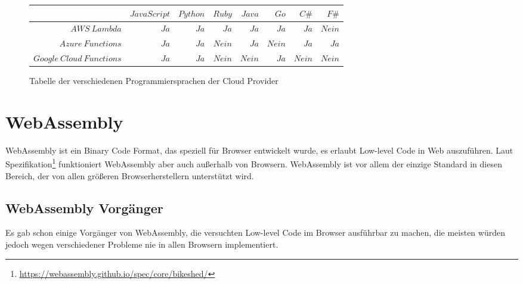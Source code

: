 \begin{figure}[ht]
	\centering
	\begin{tabular}{r|rrrrrrr}
		                  & $JavaScript$ & $Python$ & $Ruby$ & $Java$ & $Go$ & $C\#$ & $F\#$ \\ \hline
		$AWS\ Lambda$      & $Ja$         & $Ja$     & $Ja$   & $Ja$   & $Ja$ & $Ja$ & $Nein$ \\
		$Azure\ Functions$ & $Ja$         & $Ja$     & $Nein$ & $Ja$   &$Nein$& $Ja$ & $Ja$ \\
		$Google\ Cloud\ Functions$ & $Ja$ & $Ja$ & $Nein$ & $Nein$ & $Ja$ & $Nein$ & $Nein$
	\end{tabular}
	\caption{
		Tabelle der verschiedenen Programmiersprachen der Cloud Provider \autocite[]{faqlambda} \autocite[]{azurefunc} \autocite[]{googlefunc}
	}
	\label{table:ProgrammingLang}
\end{figure}

\section{WebAssembly}
\label{section:WebAssembly}

WebAssembly ist ein Binary Code Format, das speziell für Browser entwickelt wurde, es erlaubt Low-level Code in Web auszuführen. Laut Spezifikation\footnote{\url{https://webassembly.github.io/spec/core/bikeshed/}} funktioniert WebAssembly aber auch außerhalb von Browsern. WebAssembly ist vor allem der einzige Standard in diesen Bereich, der von allen größeren Browserherstellern unterstützt wird.

\subsection{WebAssembly Vorgänger}

Es gab schon einige Vorgänger von WebAssembly, die versuchten Low-level Code im Browser ausführbar zu machen, die meisten würden jedoch wegen verschiedener Probleme nie in allen Browsern implementiert.

